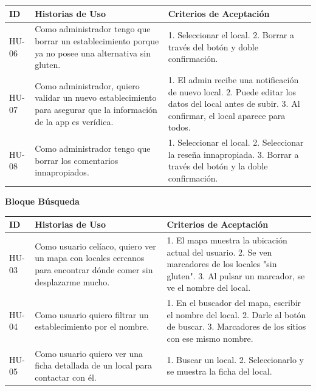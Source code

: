 \documentclass[a4paper,11pt]{article}
\begin{document}
\begin{table}[h]
    \centering
    \begin{tabular}{|p{1.5cm}|p{5cm}|p{8cm}|}
    \hline
    ID & Historias de Uso & Criterios de Aceptación \\ \hline
    HU-06 & Como administrador tengo que borrar un establecimiento porque ya no posee una alternativa sin gluten. & 1. Seleccionar el local. 2. Borrar a través del botón y doble confirmación.\\ \hline
    HU-07 & Como administrador, quiero validar un nuevo establecimiento para asegurar que la información de la app es verídica.  & 1. El admin recibe una notificación de nuevo local. 2. Puede editar los datos del local antes de subir. 3. Al confirmar, el local aparece para todos. \\ \hline
    HU-08 & Como administrador tengo que borrar los comentarios innapropiados. & 1. Seleccionar el local. 2. Seleccionar la reseña innapropiada. 3. Borrar a través del botón y la doble confirmación. \\ \hline
    \end{tabular}
\end{table}

\vspace{3cm}
\textbf{Bloque Búsqueda}
\begin{table}[h]
    \centering
    \begin{tabular}{|p{1.5cm}|p{5cm}|p{8cm}|}
    \hline
    ID & Historias de Uso & Criterios de Aceptación \\ \hline
    HU-03 & Como usuario celíaco, quiero ver un mapa con locales cercanos para encontrar dónde comer sin desplazarme mucho. & 1. El mapa muestra la ubicación actual del usuario. 2. Se ven marcadores de los locales "sin gluten". 3. Al pulsar un marcador, se ve el nombre del local.\\ \hline
    HU-04 & Como usuario quiero filtrar un establecimiento por el nombre. & 1. En el buscador del mapa, escribir el nombre del local. 2. Darle al botón de buscar. 3. Marcadores de los sitios con ese mismo nombre. \\ \hline
    HU-05 & Como usuario quiero ver una ficha detallada de un local para contactar con él.  & 1. Buscar un local. 2. Seleccionarlo y se muestra la ficha del local. \\ \hline
    \end{tabular}
\end{table}
\end{document}
